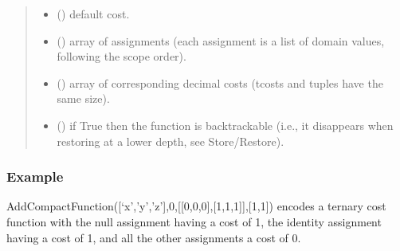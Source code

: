 \documentclass[letterpaper,10pt,openany,oneside,english]{sphinxmanual}
\begin{document}
\begin{fulllineitems}
\begin{fulllineitems}
\begin{quote}
\begin{description}
\begin{itemize}
\item {} 
\sphinxAtStartPar
{} () \textendash{} default cost.

\item {} 
\sphinxAtStartPar
{} () \textendash{} array of assignments (each assignment is a list of domain values, following the scope order).

\item {} 
\sphinxAtStartPar
{} () \textendash{} array of corresponding decimal costs (tcosts and tuples have the same size).

\item {} 
\sphinxAtStartPar
{} () \textendash{} if True then the function is backtrackable (i.e., it disappears when restoring at a lower depth, see Store/Restore).

\end{itemize}

\end{description}\end{quote}
\subsubsection*{Example}

\sphinxAtStartPar
AddCompactFunction({[}‘x’,’y’,’z’{]},0,{[}{[}0,0,0{]},{[}1,1,1{]}{]},{[}1,\sphinxhyphen{}1{]}) encodes a ternary cost function with the null assignment having a cost of 1,
the identity assignment having a cost of \sphinxhyphen{}1, and all the other assignments a cost of 0.

\end{fulllineitems}



\end{fulllineitems}
\end{document}
